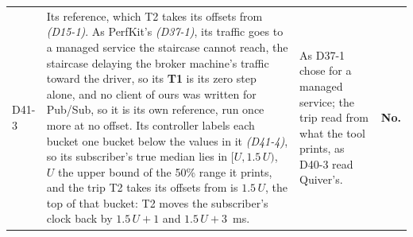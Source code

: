 \documentclass[11pt]{article}
\newcommand{\gl}[1]{{\color{soft}\itshape\small (#1)}}
\begin{document}
{\begin{longtable}{@{}p{1.1cm} >{\raggedright\arraybackslash}p{6.1cm} >{\raggedright\arraybackslash}p{6.0cm} >{\raggedright\arraybackslash}p{2.2cm}@{}}
D41-3 & Its reference, which T2 takes its offsets from \gl{D15-1}. As PerfKit's \gl{D37-1}, its traffic goes to a managed service the staircase cannot reach, the staircase delaying the broker machine's traffic toward the driver, so its \textbf{T1} is its zero step alone, and no client of ours was written for Pub/Sub, so it is its own reference, run once more at no offset. Its controller labels each bucket one bucket below the values in it \gl{D41-4}, so its subscriber's true median lies in $[U, 1.5\,U)$, $U$ the upper bound of the 50\% range it prints, and the trip T2 takes its offsets from is $1.5\,U$, the top of that bucket: T2 moves the subscriber's clock back by $1.5\,U + 1$ and $1.5\,U + 3$~ms. & As D37-1 chose for a managed service; the trip read from what the tool prints, as D40-3 read Quiver's. & \textbf{No.} \\

\end{longtable}}
\end{document}
